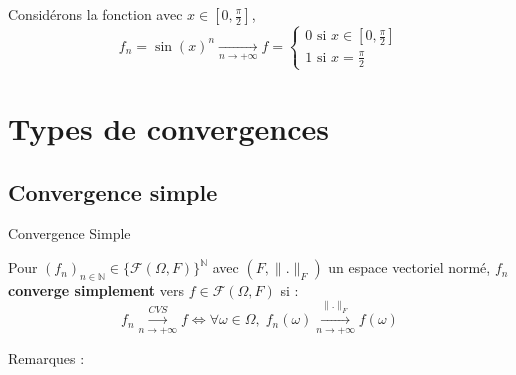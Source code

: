 \begin{Example}{}{}
  Considérons la fonction avec $x \in [0, \frac{\pi}{2}]$, 
  \begin{equation}
    f_n = \sin(x) ^{n}  \underset{n \to +\infty}{\longrightarrow} f = \begin{cases}
      0 \text{ si } x \in [0, \frac{\pi}{2} ]\\ 1 \text{ si } x = \frac{\pi}{2} 
    \end{cases}
  \end{equation}
\begin{center}
\end{center}
\end{Example}


\newpage

\section{Types de convergences} %

\subsection{Convergence simple} %

\begin{Definition}[colbacktitle=red!75!black]{Convergence Simple}{}

  Pour $(f_n ) _{n \in \mathbb{N}} \in \{ \mathscr{F}(\Omega, F)\} ^{\mathbb{N}}$ avec $(F, \| . \|_F)$ un espace vectoriel normé, $f_n$ \textbf{converge simplement} vers $f \in \mathscr{F}(\Omega,F)$ si : 
  \begin{equation}
   f_n  \overset{CVS}{\underset{n \to +\infty}{\longrightarrow}} f  \iff \forall \omega \in \Omega, \; f_n(\omega)  \overset{\| . \|_F}{\underset{n \to +\infty}{\longrightarrow}} f(\omega)
  \end{equation}
\end{Definition}

Remarques : 

